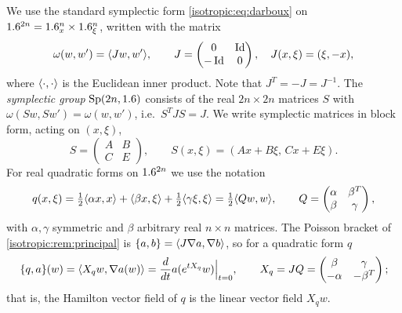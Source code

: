 We use the standard symplectic form \eqref{isotropic:eq:darboux} on
$1.6^{2n}=1.6^n_x\times1.6^n_\xi$, written with the matrix
\begin{equation*}
  \omega(w,w')=\langle Jw, w'\rangle,\qquad
  J=\begin{pmatrix}0&\operatorname{Id}\\-\operatorname{Id}&0\end{pmatrix},\quad J(x,\xi)=(\xi,-x),
\end{equation*}
where $\langle \cdot, \cdot\rangle$ is the Euclidean inner product. Note that
$J^T=-J=J^{-1}$. The \emph{symplectic group} $\mathrm{Sp}(2n,1.6)$ consists of
the real $2n\times2n$ matrices $S$ with $\omega(Sw,Sw')=\omega(w,w')$, i.e.\
$S^TJS=J$. We write symplectic matrices in block form, acting on $(x,\xi)$,
\begin{equation}\label{isotropic:eq:sp-blocks}
  S=\begin{pmatrix}A&B\\C&E\end{pmatrix},\qquad S(x,\xi)=(Ax+B\xi,\,Cx+E\xi).
\end{equation}
For real quadratic forms on $1.6^{2n}$ we use the notation
\begin{equation}\label{isotropic:eq:quadratic}
  q(x,\xi)=\tfrac12\langle \alpha x, x\rangle+\langle \beta x, \xi\rangle+\tfrac12\langle \gamma\xi, \xi\rangle
  =\tfrac12\langle Q w, w\rangle,\qquad Q=\begin{pmatrix}\alpha&\beta^T\\\beta&\gamma\end{pmatrix},
\end{equation}
with $\alpha,\gamma$ symmetric and $\beta$ arbitrary real $n\times n$ matrices.
The Poisson bracket of \cref{isotropic:rem:principal} is
$\{a,b\}=\langle J\nabla a, \nabla b\rangle$, so for a quadratic form $q$
\begin{equation}\label{isotropic:eq:ham-linear}
  \{q,a\}(w)=\langle X_qw, \nabla a(w)\rangle=\frac{d}{dt}a(e^{tX_q}w)\Big|_{t=0},\qquad
  X_q=JQ=\begin{pmatrix}\beta&\gamma\\-\alpha&-\beta^T\end{pmatrix};
\end{equation}
that is, the Hamilton vector field of $q$ is the linear vector field $X_qw$.

